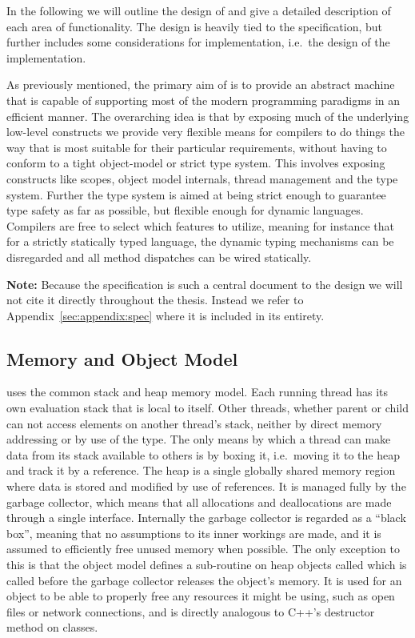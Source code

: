 In the following we will outline the design of \thename{} and give a detailed
description of each area of functionality. The design is heavily tied to the
\thename{} specification, but further includes some considerations for
implementation, i.e.~the design of the implementation.

As previously mentioned, the primary aim of \thename{} is to provide an abstract
machine that is capable of supporting most of the modern programming paradigms
in an efficient manner. The overarching idea is that by exposing much of the
underlying low-level constructs we provide very flexible means for compilers to
do things the way that is most suitable for their particular requirements,
without having to conform to a tight object-model or strict type system. This
involves exposing constructs like scopes, object model internals, thread
management and the type system. Further the type system is aimed at being strict
enough to guarantee type safety as far as possible, but flexible enough for
dynamic languages. Compilers are free to select which features to utilize,
meaning for instance that for a strictly statically typed language, the dynamic
typing mechanisms can be disregarded and all method dispatches can be wired
statically.

\textbf{Note:} Because the specification is such a central document to the
design we will not cite it directly throughout the thesis. Instead we refer to
Appendix~\ref{sec:appendix:spec} where it is included in its entirety.

\subsection{Memory and Object Model}

\thename{} uses the common stack and heap memory model. Each running thread has
its own evaluation stack that is local to itself. Other threads, whether parent
or child can not access elements on another thread's stack, neither by direct
memory addressing or by use of the  type. The only means by
which a thread can make data from its stack available to others is by boxing it,
i.e.~moving it to the heap and track it by a reference. The heap is a single
globally shared memory region where data is stored and modified by use of
references. It is managed fully by the garbage collector, which means that all
allocations and deallocations are made through a single interface. Internally
the garbage collector is regarded as a ``black box'', meaning that no
assumptions to its inner workings are made, and it is assumed to efficiently
free unused memory when possible. The only exception to this is that the object
model defines a sub-routine on heap objects called  which is
called before the garbage collector releases the object's memory. It is used for
an object to be able to properly free any resources it might be using, such as
open files or network connections, and is directly analogous to C++'s destructor
method on classes.

